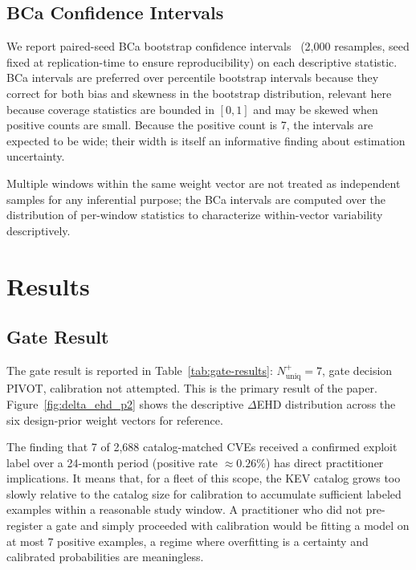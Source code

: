 \documentclass[conference]{IEEEtran}
\begin{document}
\subsection{BCa Confidence Intervals}
\label{subsec:bca}

We report paired-seed BCa bootstrap confidence intervals~\cite{efron1987better}
(2,000 resamples, seed fixed at replication-time to ensure reproducibility)
on each descriptive statistic. BCa intervals are preferred over
percentile bootstrap intervals because they correct for both bias and
skewness in the bootstrap distribution, relevant here because coverage
statistics are bounded in $[0, 1]$ and may be skewed when positive counts
are small. Because the positive count is 7, the intervals are expected to
be wide; their width is itself an informative finding about estimation
uncertainty.

Multiple windows within the same weight vector are not treated as
independent samples for any inferential purpose; the BCa intervals are
computed over the distribution of per-window statistics to characterize
within-vector variability descriptively.

\section{Results}
\label{sec:results}

\subsection{Gate Result}
\label{subsec:results-gate}

The gate result is reported in Table~\ref{tab:gate-results}:
$N^+_{\text{uniq}} = 7$, gate decision PIVOT, calibration not attempted.
This is the primary result of the paper.
Figure~\ref{fig:delta_ehd_p2} shows the descriptive $\Delta$EHD
distribution across the six design-prior weight vectors for reference.

The finding that 7 of 2,688 catalog-matched CVEs received a confirmed
exploit label over a 24-month period (positive rate $\approx 0.26\%$)
has direct practitioner implications. It means that, for a fleet of
this scope, the KEV catalog grows too slowly relative to the catalog size
for calibration to accumulate sufficient labeled examples within a reasonable
study window. A practitioner who did not pre-register a gate and simply
proceeded with calibration would be fitting a model on at most 7 positive
examples, a regime where overfitting is a certainty and calibrated
probabilities are meaningless.
\end{document}
